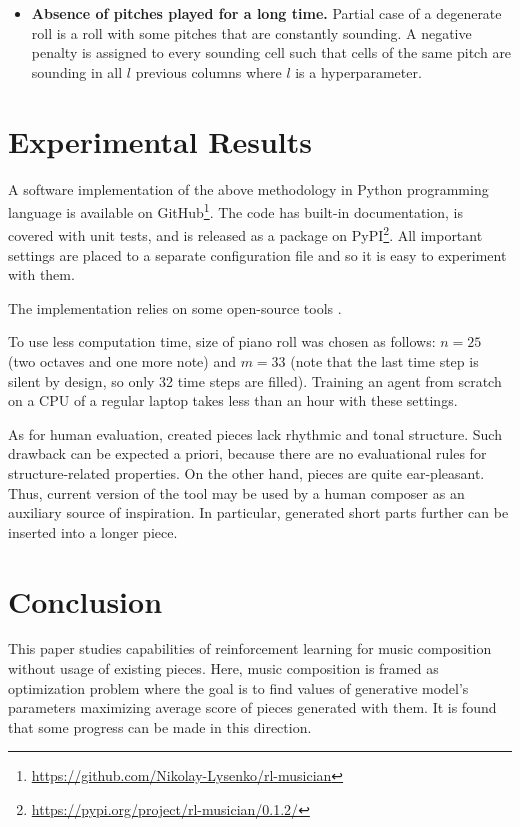 \documentclass{article}
\begin{document}
\begin{itemize}
    \item \textbf{Absence of pitches played for a long time.} Partial case of a degenerate roll is a roll with some pitches that are constantly sounding. A negative penalty is assigned to every sounding cell such that cells of the same pitch are sounding in all $l$ previous columns where $l$ is a hyperparameter.
\end{itemize}


\section{Experimental Results}
\label{sec:results}

A software implementation of the above methodology in Python programming language is available on GitHub\footnote{\url{https://github.com/Nikolay-Lysenko/rl-musician}}. The code has built-in documentation, is covered with unit tests, and is released as a package on PyPI\footnote{\url{https://pypi.org/project/rl-musician/0.1.2/}}. All important settings are placed to a separate configuration file and so it is easy to experiment with them.

The implementation relies on some open-source tools \cite{brockman2016openai,chollet2015keras,oliphant2006guide,raffel2014intuitive,dong2018pypianoroll}.

To use less computation time, size of piano roll was chosen as follows: $n = 25$ (two octaves and one more note) and $m = 33$ (note that the last time step is silent by design, so only 32 time steps are filled). Training an agent from scratch on a CPU of a regular laptop takes less than an hour with these settings.

As for human evaluation, created pieces lack rhythmic and tonal structure. Such drawback can be expected a priori, because there are no evaluational rules for structure-related properties. On the other hand, pieces are quite ear-pleasant. Thus, current version of the tool may be used by a human composer as an auxiliary source of inspiration. In particular, generated short parts further can be inserted into a longer piece.


\section{Conclusion}
\label{sec:conclusion}

This paper studies capabilities of reinforcement learning for music composition without usage of existing pieces. Here, music composition is framed as optimization problem where the goal is to find values of generative model's parameters maximizing average score of pieces generated with them. It is found that some progress can be made in this direction.
\end{document}
